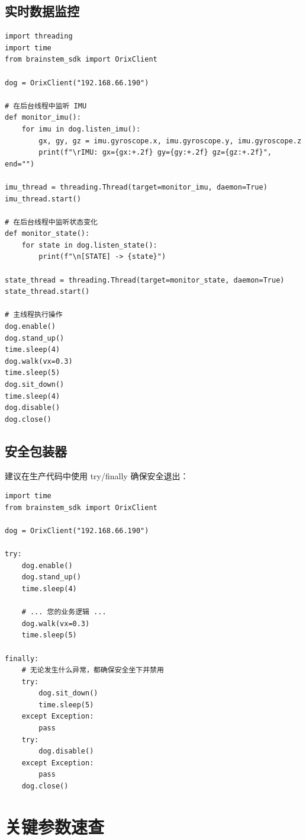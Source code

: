 \documentclass[a4paper,11pt,openany]{book}
\begin{document}
\subsection{实时数据监控}

\begin{lstlisting}[style=python]
import threading
import time
from brainstem_sdk import OrixClient

dog = OrixClient("192.168.66.190")

# 在后台线程中监听 IMU
def monitor_imu():
    for imu in dog.listen_imu():
        gx, gy, gz = imu.gyroscope.x, imu.gyroscope.y, imu.gyroscope.z
        print(f"\rIMU: gx={gx:+.2f} gy={gy:+.2f} gz={gz:+.2f}", end="")

imu_thread = threading.Thread(target=monitor_imu, daemon=True)
imu_thread.start()

# 在后台线程中监听状态变化
def monitor_state():
    for state in dog.listen_state():
        print(f"\n[STATE] -> {state}")

state_thread = threading.Thread(target=monitor_state, daemon=True)
state_thread.start()

# 主线程执行操作
dog.enable()
dog.stand_up()
time.sleep(4)
dog.walk(vx=0.3)
time.sleep(5)
dog.sit_down()
time.sleep(4)
dog.disable()
dog.close()
\end{lstlisting}

\subsection{安全包装器}

建议在生产代码中使用 try/finally 确保安全退出：

\begin{lstlisting}[style=python]
import time
from brainstem_sdk import OrixClient

dog = OrixClient("192.168.66.190")

try:
    dog.enable()
    dog.stand_up()
    time.sleep(4)

    # ... 您的业务逻辑 ...
    dog.walk(vx=0.3)
    time.sleep(5)

finally:
    # 无论发生什么异常，都确保安全坐下并禁用
    try:
        dog.sit_down()
        time.sleep(5)
    except Exception:
        pass
    try:
        dog.disable()
    except Exception:
        pass
    dog.close()
\end{lstlisting}

\section{关键参数速查}
\end{document}

